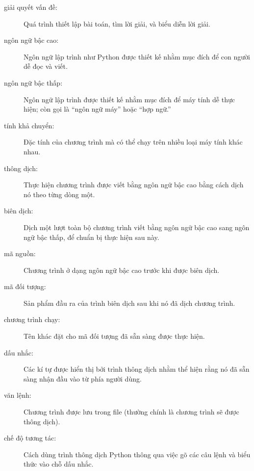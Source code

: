 \documentclass[11pt]{book}
\begin{document}
\begin{description}

\item[giải quyết vấn đề:]  Quá trình thiết lập bài toán, tìm lời
giải, và biểu diễn lời giải.

\item[ngôn ngữ bậc cao:]  Ngôn ngữ lập trình như Python được
thiết kế nhằm mục đích để con người dễ đọc và viết.

\item[ngôn ngữ bậc thấp:]  Ngôn ngữ lập trình được thiết kế
nhằm mục đích để máy tính dễ thực hiện; còn gọi là ``ngôn ngữ máy'' 
hoặc ``hợp ngữ.''

\item[tính khả chuyển:]  Đặc tính của chương trình
mà có thể chạy trên nhiều loại máy tính khác nhau.

\item[thông dịch:]  Thực hiện chương trình được viết bằng ngôn ngữ
bậc cao bằng cách dịch nó theo từng dòng một.

\item[biên dịch:]  Dịch một lượt toàn bộ chương trình viết bằng
ngôn ngữ bậc cao sang ngôn ngữ bậc thấp, để chuẩn bị thực hiện sau này.

\item[mã nguồn:]  Chương trình ở dạng ngôn ngữ bậc cao trước
khi được biên dịch.

\item[mã đối tượng:]  Sản phẩm đầu ra của trình biên dịch sau khi
nó đã dịch chương trình.

\item[chương trình chạy:]  Tên khác đặt cho mã đối tượng đã
sẵn sàng được thực hiện.

\item[dấu nhắc:] Các kí tự được hiển thị bởi trình thông dịch nhằm
thể hiện rằng nó đã sẵn sàng nhận đầu vào từ phía người dùng.

\item[văn lệnh:] Chương trình được lưu trong file (thường chính
là chương trình sẽ được thông dịch).

\item[chế độ tương tác:] Cách dùng trình thông dịch Python thông
qua việc gõ các câu lệnh và biểu thức vào chỗ dấu nhắc.


\end{description}
\end{document}
